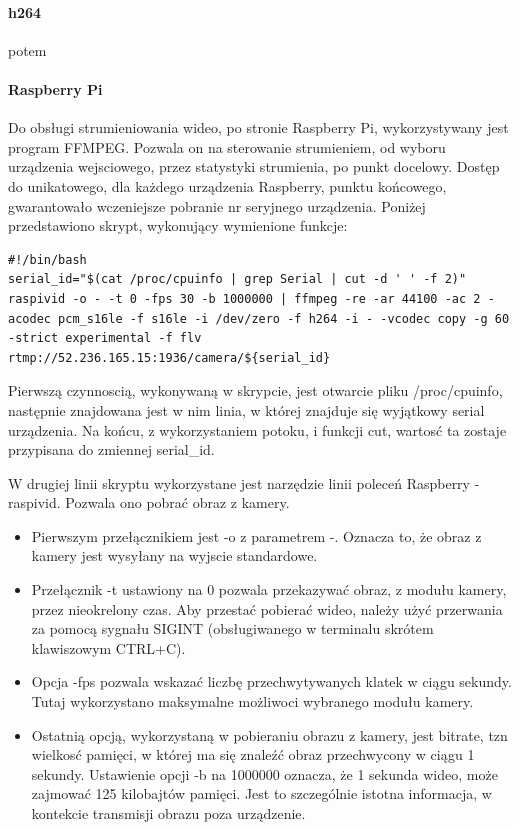 \paragraph{h264}
potem

\paragraph{Raspberry Pi}
Do obsługi strumieniowania wideo, po stronie Raspberry Pi, wykorzystywany jest program FFMPEG. Pozwala on na sterowanie strumieniem, od wyboru urządzenia wejsciowego, przez statystyki strumienia, po punkt docelowy. Dostęp do unikatowego, dla każdego urządzenia Raspberry, punktu końcowego, gwarantowało wczeniejsze pobranie nr seryjnego urządzenia. Poniżej przedstawiono skrypt, wykonujący wymienione funkcje:
\begin{verbatim}
#!/bin/bash
serial_id="$(cat /proc/cpuinfo | grep Serial | cut -d ' ' -f 2)"
raspivid -o - -t 0 -fps 30 -b 1000000 | ffmpeg -re -ar 44100 -ac 2 -acodec pcm_s16le -f s16le -i /dev/zero -f h264 -i - -vcodec copy -g 60 -strict experimental -f flv rtmp://52.236.165.15:1936/camera/${serial_id}
\end{verbatim}
Pierwszą czynnoscią, wykonywaną w skrypcie, jest otwarcie pliku /proc/cpuinfo, następnie znajdowana jest w nim linia, w której znajduje się wyjątkowy serial urządzenia. Na końcu, z wykorzystaniem potoku, i funkcji cut, wartosć ta zostaje przypisana do zmiennej serial_id.

W drugiej linii skryptu wykorzystane jest narzędzie linii poleceń Raspberry - raspivid. Pozwala ono pobrać obraz z kamery. 
\begin{itemize}
\item Pierwszym przełącznikiem jest -o z parametrem -. Oznacza to, że obraz z kamery jest wysyłany na wyjscie standardowe.
\item Przełącznik -t ustawiony na 0 pozwala przekazywać obraz, z modułu kamery, przez nieokrelony czas. Aby przestać pobierać wideo, należy użyć przerwania za pomocą sygnału SIGINT (obsługiwanego w terminalu skrótem klawiszowym CTRL+C).
\item Opcja -fps pozwala wskazać liczbę przechwytywanych klatek w ciągu sekundy. Tutaj wykorzystano maksymalne możliwoci wybranego modułu kamery.
\item Ostatnią opcją, wykorzystaną w pobieraniu obrazu z kamery, jest bitrate, tzn wielkosć pamięci, w której ma się znaleźć obraz przechwycony w ciągu 1 sekundy. Ustawienie opcji -b na 1000000 oznacza, że 1 sekunda wideo, może zajmować 125 kilobajtów pamięci. Jest to szczególnie istotna informacja, w kontekcie transmisji obrazu poza urządzenie.
\end{itemize}

